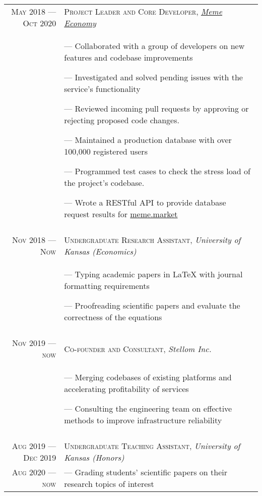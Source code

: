 \documentclass[a4paper, 10pt]{article}
\begin{document}
\begin{tabular}{r|p{12cm}}
	\textsc{May 2018 --- Oct 2020} & \textsc{Project Leader and Core Developer}, \emph{\href{https://meme.market}{Meme Economy}} \\&\footnotesize{
		--- Collaborated with a group of developers on new features and codebase improvements

		--- Investigated and solved pending issues with the service's functionality

		--- Reviewed incoming pull requests by approving or rejecting proposed code changes.

		--- Maintained a production database with over 100,000 registered users

		--- Programmed test cases to check the stress load of the project's codebase.

		--- Wrote a RESTful API to provide database request results for \href{https://meme.market}{meme.market}
	}                                                                                                                            \\\multicolumn{2}{c}{}\\
	
	\textsc{Nov 2018 --- Now}      & \textsc{Undergraduate Research Assistant}, \emph{University of Kansas (Economics)}           \\&\footnotesize{
		--- Typing academic papers in \LaTeX{} with journal formatting requirements

		--- Proofreading scientific papers and evaluate the correctness of the equations
	}                                                                                                                            \\\multicolumn{2}{c}{}\\
	
	\textsc{Nov 2019 --- now}      & \textsc{Co-founder and Consultant}, \emph{Stellom Inc.}                                     \\&\footnotesize{
		--- Merging codebases of existing platforms and accelerating profitability of services

		--- Consulting the engineering team on effective methods to improve infrastructure reliability
	}                                                                                                                            \\\multicolumn{2}{c}{}\\
	
	\textsc{Aug 2019 --- Dec 2019} & \textsc{Undergraduate Teaching Assistant}, \emph{University of Kansas (Honors)}              \\ \textsc{Aug 2020 --- now} &\footnotesize{
		--- Grading students' scientific papers on their research topics of interest

}
\end{tabular}
\end{document}
